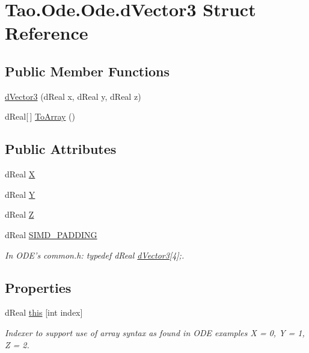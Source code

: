 \hypertarget{struct_tao_1_1_ode_1_1_ode_1_1d_vector3}{
\section{Tao.Ode.Ode.dVector3 Struct Reference}
\label{struct_tao_1_1_ode_1_1_ode_1_1d_vector3}
}
\subsection*{Public Member Functions}
\begin{DoxyCompactItemize}
\item 
\hyperlink{struct_tao_1_1_ode_1_1_ode_1_1d_vector3_a7d41e6a806e194993b96b4303affe457}{dVector3} (dReal x, dReal y, dReal z)
\item 
dReal\mbox{[}$\,$\mbox{]} \hyperlink{struct_tao_1_1_ode_1_1_ode_1_1d_vector3_a0038262c5fcbcbe121229704e77de2e7}{ToArray} ()
\end{DoxyCompactItemize}
\subsection*{Public Attributes}
\begin{DoxyCompactItemize}
\item 
dReal \hyperlink{struct_tao_1_1_ode_1_1_ode_1_1d_vector3_ace6e92820a8a72f1449fec5b01ac55c1}{X}
\item 
dReal \hyperlink{struct_tao_1_1_ode_1_1_ode_1_1d_vector3_ab8e6e790e2825950452c6abc6ce13dfc}{Y}
\item 
dReal \hyperlink{struct_tao_1_1_ode_1_1_ode_1_1d_vector3_ac487dad890cd7f976cc8cfd622590373}{Z}
\item 
dReal \hyperlink{struct_tao_1_1_ode_1_1_ode_1_1d_vector3_a55bee0bf3fa4d5d18117dc6043db7758}{SIMD\_\-PADDING}
\begin{DoxyCompactList}\small\item\em In ODE's common.h: typedef dReal \hyperlink{struct_tao_1_1_ode_1_1_ode_1_1d_vector3}{dVector3}\mbox{[}4\mbox{]};. \item\end{DoxyCompactList}\end{DoxyCompactItemize}
\subsection*{Properties}
\begin{DoxyCompactItemize}
\item 
dReal \hyperlink{struct_tao_1_1_ode_1_1_ode_1_1d_vector3_acb18e71abfce950a8d13163525918465}{this} \mbox{[}int index\mbox{]}
\begin{DoxyCompactList}\small\item\em Indexer to support use of array syntax as found in ODE examples X = 0, Y = 1, Z = 2. \item\end{DoxyCompactList}\end{DoxyCompactItemize}


